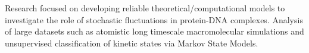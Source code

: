 
\begin{cvparagraph}
    Research focused on developing reliable theoretical/computational models to investigate the role of stochastic fluctuations in protein-DNA complexes. Analysis of large datasets such as atomistic long timescale macromolecular simulations and unsupervised classification of kinetic states via Markov State Models.
\end{cvparagraph}
